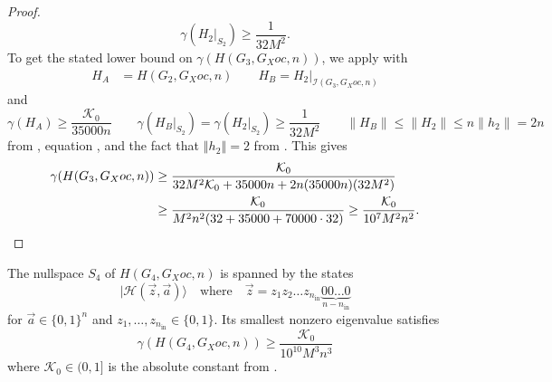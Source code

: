 \documentclass[../thesis-main/thesis-main]{subfiles}
\begin{document}
\begin{proof}
\begin{equation}
  \gamma(H_{2}|_{S_{2}}) \geq \frac{1}{32M^{2}}.\label{eq:gamma_HB}
\end{equation}
To get the stated lower bound on $\gamma(H(G_{3},G_Xoc,n))$, we apply  with 
\begin{align}
  H_{A} &= H(G_{2},G_Xoc,n) \qquad H_{B}=H_{2}|_{\mathcal{I}(G_{3},G_Xoc,n)}
\end{align}
and 
\begin{equation}
  \gamma(H_{A}) \geq \frac{\mathcal{K}_0}{35000 n} \qquad
  \gamma(H_{B}|_{S_{2}}) = \gamma(H_{2}|_{S_{2}}) 
  \geq \frac{1}{32 M^{2}} \qquad
  \|H_{B}\| \leq \|H_{2}\| \leq n \|h_{2}\| = 2n
\label{eq:gamma_HA}
\end{equation}
from , equation , and the fact that $\left\Vert h_{2}\right\Vert =2$ from . This gives 
\begin{align}
  \gamma(H(G_3,G_Xoc,n)) 
  &\geq \frac{\mathcal{K}_0}{32M^2\mathcal{K}_0+35000n +2n(35000n)(32M^2)} \\
  &\geq \frac{\mathcal{K}_0}{M^2 n^2(32+35000+70000\cdot32)}
   \geq \frac{\mathcal{K}_0}{10^7 M^2 n^2}. \qedhere
\end{align}
\end{proof}

\begin{lemma}
\label{lem:G_IV}The nullspace $S_4$ of $H(G_{4},G_Xoc,n)$ is spanned by
the states 
\begin{equation}
|\mathcal{H}\left(\vec{z},\vec{a}\right)\rangle\quad\text{where}\quad\vec{z}=z_{1}z_{2}\ldots z_{n_{\text{in}}}\underbrace{00\ldots0}_{n-n_{\text{in}}}\label{eq:history_states_zero_init}
\end{equation}
for $\vec{a}\in\{0,1\}^{n}$ and $z_{1},\ldots,z_{n_{\text{in}}}\in\{0,1\}$.
Its smallest nonzero eigenvalue satisfies
\begin{equation}
\gamma(H(G_{4},G_Xoc,n)) \geq \frac{\mathcal{K}_0}{10^{10} M^3n^3}
\end{equation}
where $\mathcal{K}_0\in (0,1]$ is the absolute constant from .
\end{lemma}
\end{document}
